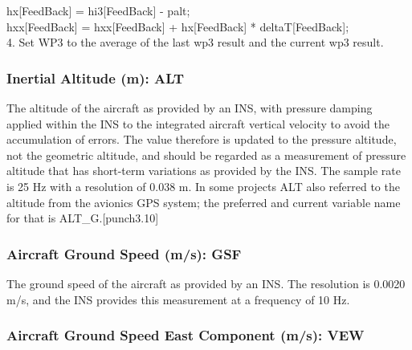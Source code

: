 \documentclass[
  english,
]{book}
\begin{document}
\hspace*{0.333em}\hspace*{0.333em}\hspace*{0.333em}\hspace*{0.333em}\hspace*{0.333em}hx{[}FeedBack{]} = hi3{[}FeedBack{]} - palt;\\
\hspace*{0.333em}\hspace*{0.333em}\hspace*{0.333em}\hspace*{0.333em}\hspace*{0.333em}hxx{[}FeedBack{]} = hxx{[}FeedBack{]} + hx{[}FeedBack{]} * deltaT{[}FeedBack{]};\\
\hspace*{0.333em}4. Set WP3 to the average of the last wp3 result and the current wp3
result.

\hypertarget{alt}{%
\subsubsection*{Inertial Altitude (m): ALT}\label{alt}}

The altitude of the aircraft as provided by an INS, with pressure damping applied within the INS to the integrated aircraft vertical velocity to avoid the accumulation of errors. The value therefore is updated to the pressure altitude, not the geometric altitude, and should be regarded as a measurement of pressure altitude that has short-term variations as provided by the INS. The sample rate is 25 Hz with a resolution of 0.038 m. In some projects ALT also referred to the altitude from the avionics GPS system; the preferred and current variable name for that is ALT\_G.\protect\hypertarget{punch3.10}{}{{[}punch3.10{]}}

\hypertarget{gsf}{%
\subsubsection*{Aircraft Ground Speed (m/s): GSF}\label{gsf}}

The ground speed of the aircraft as provided by an INS. The resolution is 0.0020 m/s, and the INS provides this measurement at a frequency of 10 Hz.

\hypertarget{vew}{%
\subsubsection*{Aircraft Ground Speed East Component (m/s): VEW}\label{vew}}
\end{document}
